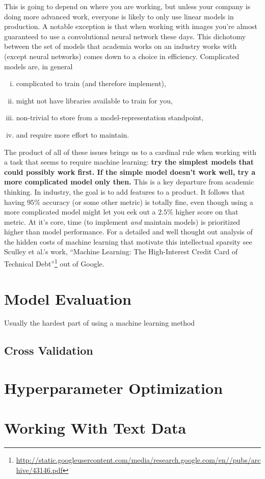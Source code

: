 \documentclass[12pt,letterpaper]{article}
\begin{document}
This is going to depend on where you are working, but unless your company is
doing more advanced work, everyone is likely to only use linear models in production.
A notable exception is that when working with images you're almost guaranteed to
use a convolutional neural network these days. This dichotomy between the set of models
that academia works on an industry works with (except neural networks) comes down
to a choice in efficiency. Complicated models are, in general
\begin{enumerate}[(i)]
    \item complicated to train (and therefore implement),
    \item might not have libraries available to train for you,
    \item non-trivial to store from a model-representation standpoint,
    \item and require more effort to maintain.
\end{enumerate}
The product of all of these issues brings us to a cardinal rule when working with
a task that seems to require machine learning: \textbf{try the simplest models that
    could possibly work first. If the simple model doesn't work well, try a more
complicated model only then.} This is a key departure from academic thinking. In industry,
the goal is to add features to a product. It follows that having $95\%$ accuracy (or some
other metric) is totally fine, even though using a more complicated model might let you
eek out a $2.5\%$ higher score on that metric. At it's core, time (to implement \textit{and}
maintain models) is prioritized higher than model performance. For a detailed and well
thought out analysis of the hidden costs of machine learning that motivate this intellectual
sparsity see Sculley et al.'s work, ``Machine Learning: The High-Interest Credit Card of
Technical Debt''\footnote{\url{http://static.googleusercontent.com/media/research.google.com/en//pubs/archive/43146.pdf}}
out of Google.

\section{Model Evaluation}

Usually the hardest part of using a machine learning method

\subsection{Cross Validation}

\section{Hyperparameter Optimization}

\section{Working With Text Data}
\end{document}
